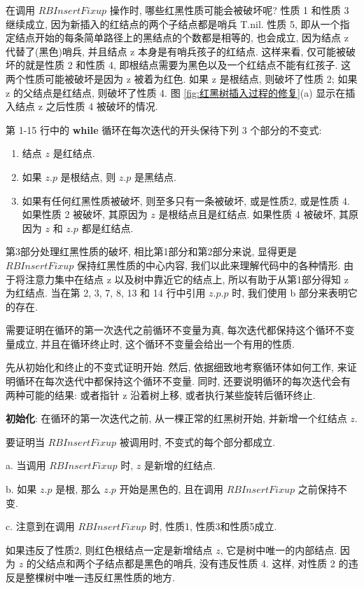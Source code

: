 \documentclass[oneside,10pt,fontset=none]{ctexbook}
\numberwithin{definition}{chapter}
\numberwithin{theorem}{chapter}
\numberwithin{lemma}{chapter}
\begin{document}
在调用 $RBInsertFixup$ 操作时, 哪些红黑性质可能会被破坏呢? 性质 1 和性质 3 继续成立, 因为新插入的红结点的两个子结点都是哨兵 T.nil. 性质 5, 即从一个指定结点开始的每条简单路径上的黑结点的个数都是相等的, 也会成立, 因为结点 z 代替了(黑色)哨兵, 并且结点 z 本身是有哨兵孩子的红结点. 这样来看, 仅可能被破坏的就是性质 2 和性质 4, 即根结点需要为黑色以及一个红结点不能有红孩子. 这两个性质可能被破坏是因为 z 被着为红色. 如果 z 是根结点, 则破坏了性质 2; 如果 z 的父结点是红结点, 则破坏了性质 4. 图 \ref{fig:红黑树插入过程的修复}(a) 显示在插入结点 z 之后性质 4 被破坏的情况.

第 1-15 行中的 \textbf{while} 循环在每次迭代的开头保待下列 3 个部分的不变式:

\begin{enumerate}
    \item 结点 $z$ 是红结点.
    \item 如果 $z.p$ 是根结点, 则 $z.p$ 是黑结点.
    \item 如果有任何红黑性质被破坏, 则至多只有一条被破坏, 或是性质2, 或是性质 4. 如果性质 2 被破坏, 其原因为 $z$ 是根结点且是红结点. 如果性质 4 被破坏, 其原因为 $z$ 和 $z.p$ 都是红结点.
\end{enumerate}

第3部分处理红黑性质的破坏, 相比第1部分和第2部分来说, 显得更是 $RBInsertFixup$ 保持红黑性质的中心内容, 我们以此来理解代码中的各种情形. 由于将注意力集中在结点 z 以及树中靠近它的结点上, 所以有助于从第1部分得知 z 为红结点. 当在第 2, 3, 7, 8, 13 和 14 行中引用 $z.p.p$ 时, 我们使用 b 部分来表明它的存在.

需要证明在循环的第一次迭代之前循环不变量为真, 每次迭代都保持这个循环不变量成立, 并且在循环终止时, 这个循环不变量会给出一个有用的性质.

先从初始化和终止的不变式证明开始. 然后, 依据细致地考察循环体如何工作, 来证明循环在每次迭代中都保持这个循环不变量. 同时, 还要说明循环的每次迭代会有两种可能的结果: 或者指针 z 沿着树上移, 或者执行某些旋转后循环终止.

\textbf{初始化}: 在循环的第一次迭代之前, 从一棵正常的红黑树开始, 并新增一个红结点 $z$.

要证明当 $RBInsertFixup$ 被调用时, 不变式的每个部分都成立.

a. 当调用 $RBInsertFixup$ 时, $z$ 是新增的红结点.

b. 如果 $z.p$ 是根, 那么 $z.p$ 开始是黑色的, 且在调用 $RBInsertFixup$ 之前保持不变.

c. 注意到在调用 $RBInsertFixup$ 时, 性质1, 性质3和性质5成立.

如果违反了性质2, 则红色根结点一定是新增结点 $z$, 它是树中唯一的内部结点. 因为 $z$ 的父结点和两个子结点都是黑色的哨兵, 没有违反性质 4. 这样, 对性质 2 的违反是整棵树中唯一违反红黑性质的地方.
\end{document}
